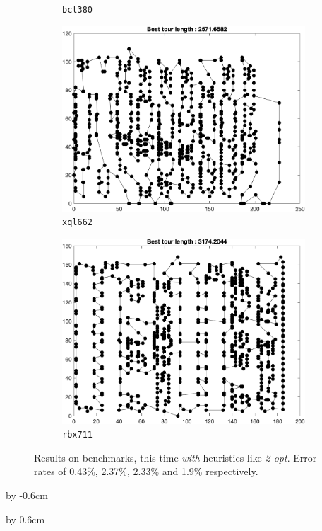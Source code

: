 \begin{figure}[H]
\begin{subfigure}[b]{0.45\textwidth}
		\caption{\texttt{bcl380}}
    	\end{subfigure}
	\begin{subfigure}[b]{0.45\textwidth}
		\centering
		\includegraphics[width=\textwidth]{benchmarks/final/xql662.png}
		\caption{\texttt{xql662}}
    	\end{subfigure}
	\begin{subfigure}[b]{0.45\textwidth}
		\centering
		\includegraphics[width=\textwidth]{benchmarks/final/rbx711.png}
		\caption{\texttt{rbx711}}
    	\end{subfigure}
\caption{Results on benchmarks, this time \textit{with} heuristics like \textit{2-opt}. Error rates of 0.43\%, 2.37\%, 2.33\% and 1.9\% respectively.}
\label{fig:bench1}
\end{figure}

\newpage
\advance\voffset by -0.6cm

\advance\voffset by 0.6cm



